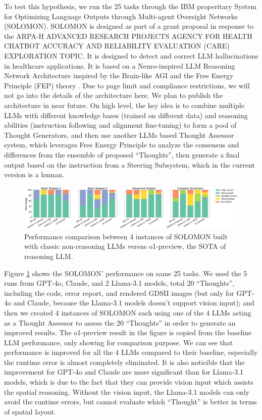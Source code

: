 \documentclass{article}
\begin{document}
To test this hypothesis, we run the 25 tasks through the IBM properitary System for Optimizing Language Outputs through Multi-agent Oversight Networks (SOLOMON). SOLOMON is designed as part of a grant proposal in response to the ARPA-H ADVANCED RESEARCH PROJECTS AGENCY FOR HEALTH CHATBOT ACCURACY AND RELIABILITY EVALUATION (CARE) EXPLORATION TOPIC. It is designed to detect and correct LLM hallucinations in healthcare applications. It is based on a Neuro-inspired LLM Reasoning Network Architecture inspired by the Brain-like AGI \cite{Brain-AGI} and the Free Energy Principle (FEP) theory \cite{FEP}. Due to page limit and compliance restrictions, we will not go into the details of the architecture here. We plan to publish the architecture in near future. On high level, the key idea is to combine multiple LLMs with different knowledge bases (trained on different data) and reasoning abilities (instruction following and alignment fine-tuning) to form a pool of Thought Generators, and then use another LLMs based Thought Assessor system, which leverages Free Energy Principle to analyze the consensus and differences from the ensemble of proposed ``Thoughts'', then generate a final output based on the instruction from a Steering Subsystem, which in the current version is a human.

\begin{figure}[h]
  \centering
  \includegraphics[width=\textwidth]{judges-performance.png}
  \caption{Performance comparison between 4 instances of SOLOMON built with classic non-reasoning LLMs versus o1-preview, the SOTA of reasoning LLM.}
  \label{fig:judges-performance}
\end{figure}

Figure \ref{fig:judges-performance} shows the SOLOMON' performance on same 25 tasks. We used the 5 runs from GPT-4o, Claude, and 2 Llama-3.1 models, total 20 ``Thoughts'', including the code, error report, and rendered GDSII images (but only for GPT-4o and Claude, because the Llama-3.1 models doesn't support vision input); and then we created 4 instances of SOLOMON each using one of the 4 LLMs acting as a Thought Assessor to assess the 20 ``Thoughts'' in order to generate an improved results. The o1-preview result in the figure is copied from the baseline LLM performance, only showing for comparison purpose. We can see that performance is improved for all the 4 LLMs compared to their baseline, especially the runtime error is almost completely eliminated. It is also noticible that the improvement for GPT-4o and Claude are more significant than for Llama-3.1 models, which is due to the fact that they can provide vision input which assists the spatial reasoning. Without the vision input, the Llama-3.1 models can only avoid the runtime errors, but cannot evaluate which ``Thought'' is better in terms of spatial layout.
\end{document}
